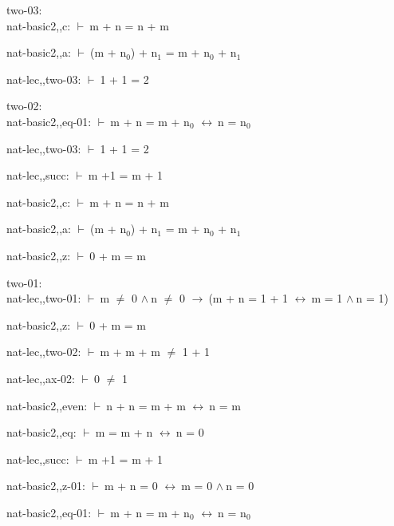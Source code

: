 \documentclass[a4paper]{article}
\newcommand{\Fol}{\mbox{$\vdash\ $}}
\newcommand{\And}{\mbox{$\wedge\ $}}
\newcommand{\Imp}{\mbox{$\rightarrow\ $}}
\newcommand{\Equiv}{\mbox{$\leftrightarrow\ $}}
\begin{document}
two-03:\\ nat-basic2,,c: 
 \Fol m + n = n + m



nat-basic2,,a: 
 \Fol (m + $\mbox{n}_{0}$) + $\mbox{n}_{1}$ = m + $\mbox{n}_{0}$ + $\mbox{n}_{1}$



nat-lec,,two-03: 
 \Fol 1 + 1 = 2



\bigskip

two-02:\\ nat-basic2,,eq-01: 
 \Fol m + n = m + $\mbox{n}_{0}$ \Equiv n = $\mbox{n}_{0}$



nat-lec,,two-03: 
 \Fol 1 + 1 = 2



nat-lec,,succ: 
 \Fol m +1 = m + 1



nat-basic2,,c: 
 \Fol m + n = n + m



nat-basic2,,a: 
 \Fol (m + $\mbox{n}_{0}$) + $\mbox{n}_{1}$ = m + $\mbox{n}_{0}$ + $\mbox{n}_{1}$



nat-basic2,,z: 
 \Fol 0 + m = m



\bigskip

two-01:\\ nat-lec,,two-01: 
 \Fol m $\neq$ 0 \And n $\neq$ 0 \Imp (m + n = 1 + 1 \Equiv m = 1 \And n = 1)

nat-basic2,,z: 
 \Fol 0 + m = m



nat-lec,,two-02: 
 \Fol m + m + m $\neq$ 1 + 1



nat-lec,,ax-02: 
 \Fol 0 $\neq$ 1



nat-basic2,,even: 
 \Fol n + n = m + m \Equiv n = m



nat-basic2,,eq: 
 \Fol m = m + n \Equiv n = 0



nat-lec,,succ: 
 \Fol m +1 = m + 1



nat-basic2,,z-01: 
 \Fol m + n = 0 \Equiv m = 0 \And n = 0



nat-basic2,,eq-01: 
 \Fol m + n = m + $\mbox{n}_{0}$ \Equiv n = $\mbox{n}_{0}$
\end{document}
